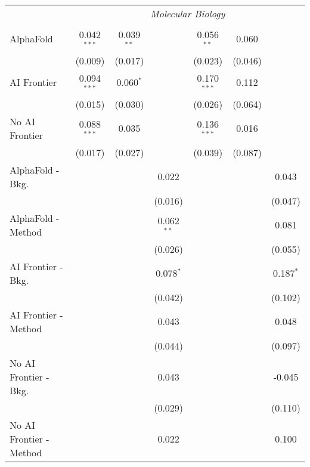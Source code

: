 \begin{tabular}{lcccccc}
 & \multicolumn{6}{c}{\textit{Molecular Biology}} \\ \\
   AlphaFold               & 0.042$^{***}$ & 0.039$^{**}$ &              & 0.056$^{**}$  & 0.060   &   \\   
                           & (0.009)       & (0.017)      &              & (0.023)       & (0.046) &   \\   
   AI Frontier             & 0.094$^{***}$ & 0.060$^{*}$  &              & 0.170$^{***}$ & 0.112   &   \\   
                           & (0.015)       & (0.030)      &              & (0.026)       & (0.064) &   \\   
   No AI Frontier          & 0.088$^{***}$ & 0.035        &              & 0.136$^{***}$ & 0.016   &   \\   
                           & (0.017)       & (0.027)      &              & (0.039)       & (0.087) &   \\   
   AlphaFold - Bkg.        &               &              & 0.022        &               &         & 0.043\\   
                           &               &              & (0.016)      &               &         & (0.047)\\   
   AlphaFold - Method      &               &              & 0.062$^{**}$ &               &         & 0.081\\   
                           &               &              & (0.026)      &               &         & (0.055)\\   
   AI Frontier - Bkg.      &               &              & 0.078$^{*}$  &               &         & 0.187$^{*}$\\   
                           &               &              & (0.042)      &               &         & (0.102)\\   
   AI Frontier - Method    &               &              & 0.043        &               &         & 0.048\\   
                           &               &              & (0.044)      &               &         & (0.097)\\   
   No AI Frontier - Bkg.   &               &              & 0.043        &               &         & -0.045\\   
                           &               &              & (0.029)      &               &         & (0.110)\\   
   No AI Frontier - Method &               &              & 0.022        &               &         & 0.100\\   

\end{tabular}

